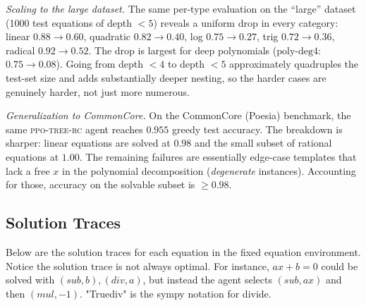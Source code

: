 \documentclass{article}
\theoremstyle{plain}
\theoremstyle{definition}
\theoremstyle{remark}
\begin{document}
\textit{Scaling to the large dataset.} The same per-type evaluation on the ``large'' dataset (1000 test equations of depth $<5$) reveals a uniform drop in every category: linear $0.88 \to 0.60$, quadratic $0.82 \to 0.40$, log $0.75 \to 0.27$, trig $0.72 \to 0.36$, radical $0.92 \to 0.52$. The drop is largest for deep polynomials ($\text{poly-deg4}$: $0.75 \to 0.08$). Going from depth $<4$ to depth $<5$ approximately quadruples the test-set size and adds substantially deeper nesting, so the harder cases are genuinely harder, not just more numerous.

\textit{Generalization to CommonCore.} On the CommonCore (Poesia) benchmark, the same \textsc{ppo-tree-rc} agent reaches $0.955$ greedy test accuracy. The breakdown is sharper: linear equations are solved at $0.98$ and the small subset of rational equations at $1.00$. The remaining failures are essentially edge-case templates that lack a free $x$ in the polynomial decomposition (\emph{degenerate} instances). Accounting for those, accuracy on the solvable subset is $\geq 0.98$.


\subsection{Solution Traces}
Below are the solution traces for each equation in the fixed equation environment. Notice the solution trace is not always optimal. For instance, $ax+b=0$ could be solved with $(sub,b),(div,a)$, but instead the agent selects $(sub,ax)$ and then $(mul,-1)$. "Truediv" is the sympy notation for divide.
\end{document}
